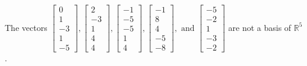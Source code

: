 \begin{exercise}
\begin{exerciseStatement}
  \end{exerciseStatement}
  \begin{exerciseAnswer}
   The vectors \(\left[\begin{array}{r}
0 \\
1 \\
-3 \\
1 \\
-5
\end{array}\right] , \left[\begin{array}{r}
2 \\
-3 \\
1 \\
4 \\
4
\end{array}\right] , \left[\begin{array}{r}
-1 \\
-5 \\
-5 \\
1 \\
4
\end{array}\right] , \left[\begin{array}{r}
-1 \\
8 \\
4 \\
-5 \\
-8
\end{array}\right] , \text{ and } \left[\begin{array}{r}
-5 \\
-2 \\
1 \\
-3 \\
-2
\end{array}\right]\) 
  	 are not  a basis of \(\mathbb{R}^5\).
  


  \end{exerciseAnswer}
\end{exercise}